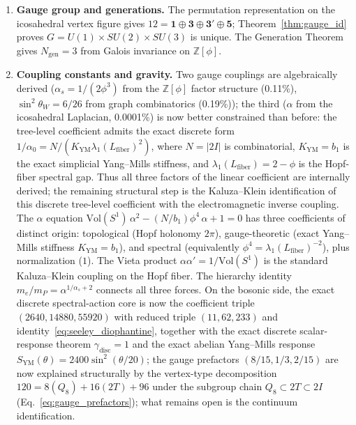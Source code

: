 \documentclass[12pt,a4paper]{article}
\theoremstyle{definition}
\begin{document}
\begin{enumerate}
\item \textbf{Gauge group and generations.}  The permutation representation on the icosahedral vertex figure gives $12 = \mathbf{1} \oplus \mathbf{3} \oplus \mathbf{3'} \oplus \mathbf{5}$; Theorem~\ref{thm:gauge_id} proves $G = U(1) \times SU(2) \times SU(3)$ is unique.  The Generation Theorem gives $N_{\text{gen}} = 3$ from Galois invariance on $\mathbb{Z}[\phi]$.

\item \textbf{Coupling constants and gravity.}  Two gauge couplings are algebraically derived ($\alpha_s = 1/(2\phi^3)$ from the $\mathbb{Z}[\phi]$ factor structure (0.11\%), $\sin^2\theta_W = 6/26$ from graph combinatorics (0.19\%)); the third ($\alpha$ from the icosahedral Laplacian, 0.0001\%) is now better constrained than before: the tree-level coefficient admits the exact discrete form $1/\alpha_0 = N/(K_{\mathrm{YM}}\lambda_1(L_{\mathrm{fiber}})^2)$, where $N=|2I|$ is combinatorial, $K_{\mathrm{YM}} = b_1$ is the exact simplicial Yang--Mills stiffness, and $\lambda_1(L_{\mathrm{fiber}})=2-\phi$ is the Hopf-fiber spectral gap.  Thus all three factors of the linear coefficient are internally derived; the remaining structural step is the Kaluza--Klein identification of this discrete tree-level coefficient with the electromagnetic inverse coupling.  The $\alpha$ equation $\text{Vol}(S^1)\,\alpha^2 - (N/b_1)\phi^4\,\alpha + 1 = 0$ has three coefficients of distinct origin: topological (Hopf holonomy $2\pi$), gauge-theoretic (exact Yang--Mills stiffness $K_{\mathrm{YM}} = b_1$), and spectral (equivalently $\phi^4 = \lambda_1(L_{\mathrm{fiber}})^{-2}$), plus normalization ($1$).  The Vieta product $\alpha\alpha' = 1/\text{Vol}(S^1)$ is the standard Kaluza--Klein coupling on the Hopf fiber.  The hierarchy identity $m_e/m_P = \alpha^{1/\alpha_s+2}$ connects all three forces.  On the bosonic side, the exact discrete spectral-action core is now the coefficient triple $(2640,14880,55920)$ with reduced triple $(11,62,233)$ and identity~\eqref{eq:seeley_diophantine}, together with the exact discrete scalar-response theorem $\gamma_{\mathrm{disc}} = 1$ and the exact abelian Yang--Mills response $S_{\mathrm{YM}}(\theta)=2400\sin^2(\theta/20)$; the gauge prefactors $(8/15, 1/3, 2/15)$ are now explained structurally by the vertex-type decomposition $120 = 8(Q_8) + 16(2T) + 96$ under the subgroup chain $Q_8 \subset 2T \subset 2I$ (Eq.~\ref{eq:gauge_prefactors}); what remains open is the continuum identification.


\end{enumerate}
\end{document}
